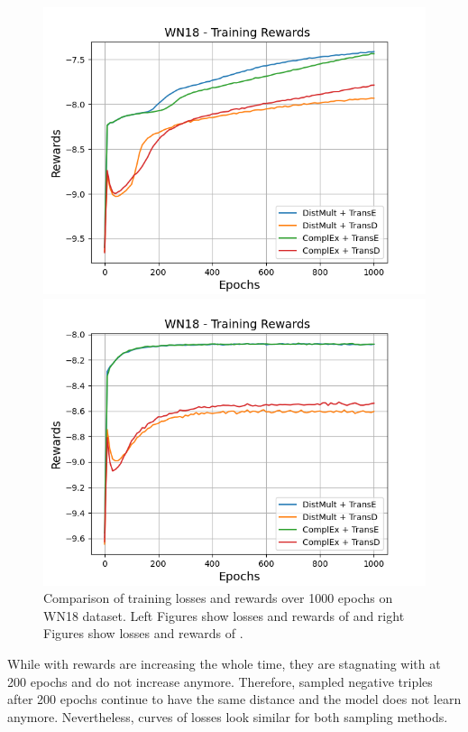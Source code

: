 \begin{figure}
\begin{minipage}{.5\textwidth}
      \centering
      \includegraphics[width=0.9\linewidth]{figures/results/gan_train/not_pretrained/random/wn18/epochs1000/random_wn18_rew.png}
    \end{minipage}%
    \begin{minipage}{.5\textwidth}
      \centering
      \includegraphics[width=0.9\linewidth]{figures/results/gan_train/not_pretrained/uncertainty/max_distribution/entropy/wn18/1k_epochs/uncertainty_wn18_rew.png}
    \end{minipage}%
    \caption{Comparison of training losses and rewards over 1000 epochs on \textsc{WN18} dataset.
    Left Figures show losses and rewards of \origsampling and right Figures show losses and rewards of \ussoftmax.}
    \label{fig:advtrain_wn18_losses_rewards}
\end{figure}
While with \origsampling rewards are increasing the whole time, they are stagnating with \ussoftmax at 200 epochs and do not increase anymore.
Therefore, sampled negative triples after 200 epochs continue to have the same distance and the model does not learn anymore.
Nevertheless, curves of losses look similar for both sampling methods.